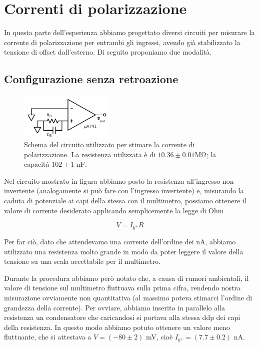 \section{Correnti di polarizzazione}

In questa parte dell'esperienza abbiamo progettato diversi circuiti per misurare la corrente di polarizzazione per entrambi gli ingressi, avendo già stabilizzato la tensione di offset dall'esterno. Di seguito proponiamo due modalità.

\subsection{Configurazione senza retroazione}

\begin{figure}
  \begin{center}
    \includegraphics[width=0.40\textwidth]{../E02/latex/direct_measure.pdf}
  \end{center}
  \caption{Schema del circuito utilizzato per stimare la corrente di polarizzazione. La resistenza utilizzata è di $10.36\pm0.01$\si{\mega\ohm}; la capacità $102 \pm 1$ \si{\nano\farad}.}
  \label{gen_continua}
\end{figure}

Nel circuito mostrato in figura abbiamo posto la resistenza all'ingresso non invertente (analogamente si può fare con l'ingresso invertente) e, misurando la caduta di potenziale ai capi della stessa con il multimetro, possiamo ottenere il valore di corrente desiderato applicando semplicemente la legge di Ohm

$$V=I_{b^+} R$$

Per far ciò, dato che attendevamo una corrente dell'ordine dei \si{\nano\ampere}, abbiamo utilizzato una resistenza molto grande in modo da poter leggere il valore della tensione su una scala accettabile per il multimetro.

Durante la procedura abbiamo però notato che, a causa di rumori ambientali, il valore di tensione sul multimetro fluttuava sulla prima cifra, rendendo nostra misurazione ovviamente non quantitativa (al massimo poteva stimarci l'ordine di grandezza della corrente). Per ovviare, abbiamo inserito in parallelo alla resistenza un condensatore che caricandosi si portava alla stessa ddp dei capi della resistenza. In questo modo abbiamo potuto ottenere un valore meno fluttuante, che si attestava a $V=(-80 \pm 2)$ \si{\milli\volt}, cioè $I_{b^+}=(7.7 \pm 0.2)$ \si{\nano\ampere}.

